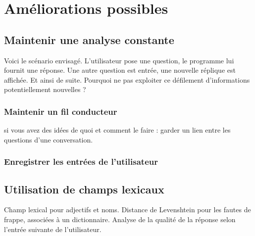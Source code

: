 \section{Améliorations possibles}
\subsection{Maintenir une analyse constante}
Voici le scénario envisagé. L'utilisateur pose une question, le programme lui fournit une réponse. Une autre question est entrée, une nouvelle réplique est affichée. Et ainsi de suite. Pourquoi ne pas exploiter ce défilement d'informations potentiellement nouvelles ?
\subsubsection{Maintenir un fil conducteur}
si vous avez des idées de quoi et comment le faire : garder un lien entre les questions d'une conversation.
\subsubsection{Enregistrer les entrées de l'utilisateur}
\subsection{Utilisation de champs lexicaux}%
Champ lexical pour adjectifs et noms.
Distance de Levenshtein pour les fautes de frappe, associées à un dictionnaire.
Analyse de la qualité de la réponse selon l'entrée suivante de l'utilisateur.